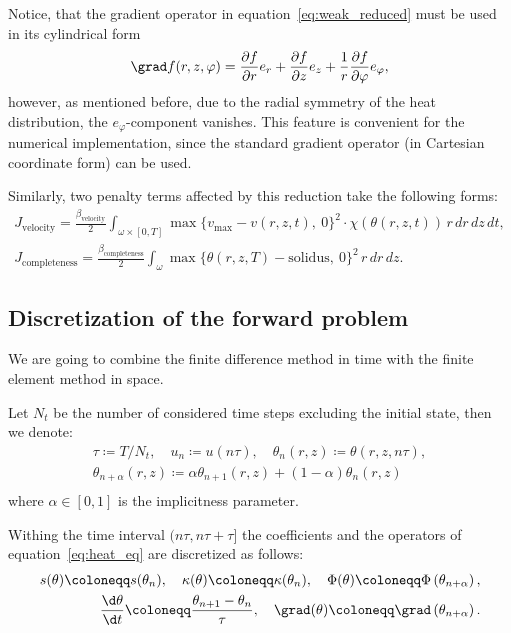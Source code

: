 Notice, that the gradient operator in equation~\eqref{eq:weak_reduced} must be used in its cylindrical form
\begin{equation*}
	\grad f(r,z,\varphi) =
		\frac{\partial f}{\partial r} e_r
		+
		\frac{\partial f}{\partial z} e_z
		+
		\frac{1}{r} \frac{\partial f}{\partial \varphi} e_{\varphi},
\end{equation*}
however, as mentioned before, due to the radial symmetry of the heat distribution, the $e_{\varphi}$-component vanishes. This feature is convenient for the numerical implementation, since the standard gradient operator (in Cartesian coordinate form) can be used.

Similarly, two penalty terms affected by this reduction take the following forms:
\begin{eqnarray}
	\label{eq:J_velocity_r}
	J_\text{velocity} =
	\frac{\beta_\text{velocity}}{2}
	\int_{\omega \times [0,T]} \max \{ v_{\max} - v(r,z,t),\ 0 \}^2 \cdot \chi(\theta(r,z,t))\, r\, dr\, dz\, dt, \\
	\label{eq:J_completeness_r}
	J_\text{completeness} =
	\frac{\beta_\text{completeness}}{2} \int_{\omega} \max\{ \theta(r,z,T) - \text{solidus},\ 0 \}^2\, r\, dr\, dz.
\end{eqnarray}


\subsection{Discretization of the forward problem}

We are going to combine the finite difference method in time with the finite element method in space.


Let $N_t$ be the number of considered time steps excluding the initial state, then we denote:
\begin{equation}
\begin{split}
	\tau \coloneqq T/N_t, \quad	u_n \coloneqq u(n\tau),	\quad \theta_n(r,z) \coloneqq \theta(r,z,n\tau), \\
	\theta_{n+\alpha}(r,z) \coloneqq \alpha\theta_{n+1}(r,z) + (1-\alpha)\theta_n(r,z)\\
\end{split}
\end{equation}
where $\alpha \in [0,1]$ is the implicitness parameter.

Withing the time interval $(n\tau, n\tau+\tau]$ the coefficients and the operators of equation~\eqref{eq:heat_eq} are discretized as follows:
\begin{equation}
\begin{split}
	s(\theta) \coloneqq s(\theta_n), \quad \kappa(\theta) \coloneqq \kappa(\theta_n), \quad \Phi(\theta) \coloneqq \Phi\left(\theta_{n+\alpha}\right), \\
	\frac{\d\theta}{\d t} \coloneqq \frac{\theta_{n+1}-\theta_n}{\tau}, \quad
	\grad(\theta) \coloneqq \grad\left(\theta_{n+\alpha}\right).
\end{split}
\end{equation}

